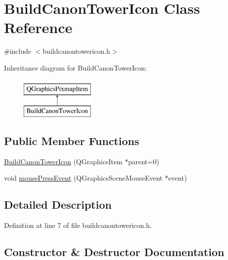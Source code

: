 \hypertarget{class_build_canon_tower_icon}{}\section{Build\+Canon\+Tower\+Icon Class Reference}
\label{class_build_canon_tower_icon}


{\ttfamily \#include $<$buildcanontowericon.\+h$>$}

Inheritance diagram for Build\+Canon\+Tower\+Icon\+:\begin{figure}[H]
\begin{center}
\leavevmode
\includegraphics[height=2.000000cm]{class_build_canon_tower_icon}
\end{center}
\end{figure}
\subsection*{Public Member Functions}
\begin{DoxyCompactItemize}
\item 
\hyperlink{class_build_canon_tower_icon_aeb3649905f8558f236e051b269afcbf9}{Build\+Canon\+Tower\+Icon} (Q\+Graphics\+Item $\ast$parent=0)
\item 
void \hyperlink{class_build_canon_tower_icon_a81a8a1c5a2c312fb7facc4c9e423b6e5}{mouse\+Press\+Event} (Q\+Graphics\+Scene\+Mouse\+Event $\ast$event)
\end{DoxyCompactItemize}


\subsection{Detailed Description}


Definition at line 7 of file buildcanontowericon.\+h.



\subsection{Constructor \& Destructor Documentation}
\mbox{\label{class_build_canon_tower_icon_aeb3649905f8558f236e051b269afcbf9}} 

